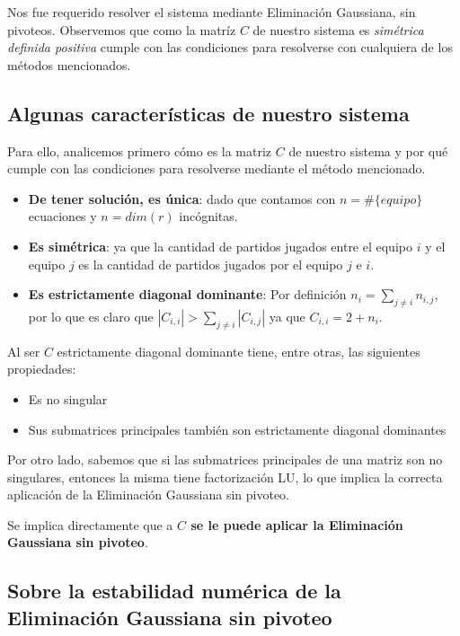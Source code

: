 Nos fue requerido resolver el sistema mediante Eliminación Gaussiana, sin pivoteos. Observemos que como la matríz $C$ de nuestro sistema es \textit{simétrica definida positiva} \cite{CMMpaper} cumple con las condiciones para resolverse con cualquiera de los métodos mencionados.

\subsection{Algunas características de nuestro sistema}

Para ello, analicemos primero cómo es la matriz $C$ de nuestro sistema y por qué cumple con las condiciones para resolverse mediante el método mencionado.

\begin{itemize}
    \item \textbf{De tener solución, es única}: dado que contamos con $n = \#\{equipo\}$ ecuaciones y $n = dim(r)$ incógnitas.
    \item \textbf{Es simétrica}: ya que la cantidad de partidos jugados entre el equipo $i$ y el equipo $j$ es la cantidad de partidos jugados por el equipo $j$ e $i$.
    \item \textbf{Es estrictamente diagonal dominante}: Por definición $n_i = \sum_{j \neq i} n_{i, j}$, por lo que es claro que $|C_{i, i}| > \sum_{j \neq i}|C_{i, j}|$ ya que $C_{i, i} = 2 + n_i$.
\end{itemize}

Al ser $C$ estrictamente diagonal dominante tiene, entre otras, las siguientes propiedades:

\begin{itemize}
    \item Es no singular
    \item Sus submatrices principales también son estrictamente diagonal dominantes
\end{itemize}

Por otro lado, sabemos que si las submatrices principales de una matriz son no singulares, entonces la misma tiene factorización LU, lo que implica la correcta aplicación de la Eliminación Gaussiana sin pivoteo.

Se implica directamente que a \textbf{$C$ se le puede aplicar la Eliminación Gaussiana sin pivoteo}.

\subsection{Sobre la estabilidad numérica de la Eliminación Gaussiana sin pivoteo}


